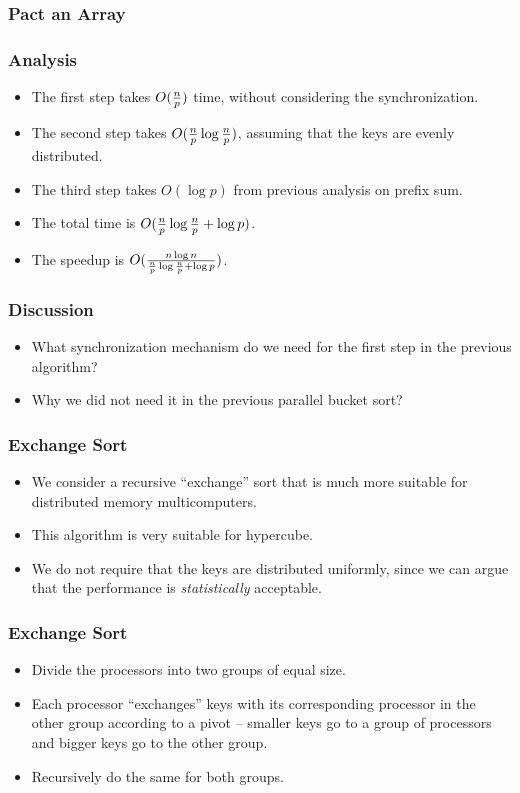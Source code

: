 \documentclass{beamer}
\begin{document}
\begin{CJK}{UTF8}{bsmi}
\begin{frame}
\frametitle{Pact an Array}
\centerline{}
\end{frame}

\begin{frame}
\frametitle{Analysis}
\begin{itemize}
\item The first step takes $O({n \over p})$ time, without considering
  the synchronization.
\item The second step takes $O({n \over p} \log {n \over p})$,
  assuming that the keys are evenly distributed.
\item The third step takes $O(\log p)$ from previous analysis
  on prefix sum.
\item The total time is $O({n \over p} \log {n \over p} + \log p)$.
\item The speedup is $O({{n \log n} \over {{{n \over p} \log {n \over
      p} + \log p}}})$.
\end{itemize}
\end{frame}


\begin{frame}
\frametitle{Discussion}
\begin{itemize}
\item What synchronization mechanism do we need for the first step in
  the previous algorithm?  
\item Why we did not need it in the previous parallel bucket sort?
\end{itemize}
\end{frame}

\begin{frame}
\frametitle{Exchange Sort}

\begin{itemize}
\item We consider a recursive ``exchange'' sort that is much more
  suitable for distributed memory multicomputers.
\item This algorithm is very suitable for hypercube.
\item We do not require that the keys are distributed uniformly, since
  we can argue that the performance is {\em statistically} acceptable.
\end{itemize}
\end{frame}

\begin{frame}
\frametitle{Exchange Sort}
\begin{itemize}
\item Divide the processors into two groups of equal size.
\item Each processor ``exchanges'' keys with its corresponding
  processor in the other group according to a pivot -- smaller keys go
  to a group of processors and bigger keys go to the other group.
\item Recursively do the same for both groups.
\end{itemize}
\end{frame}


\end{CJK}
\end{document}
